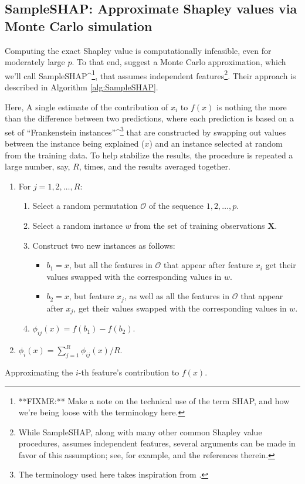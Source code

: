\subsection{SampleSHAP: Approximate Shapley values via Monte Carlo simulation \label{sec:SampleSHAP}}

Computing the exact Shapley value is computationally infeasible, even
for moderately large \(p\). To that end,
\citet{strumbelj-2014-explaining} suggest a Monte Carlo approximation,
which we'll call
SampleSHAP\^{}\footnote{**FIXME:** Make a note on the technical use of the term SHAP, and how we're being loose with the terminology here.},
that assumes independent
features\footnote{While SampleSHAP, along with many other common Shapley value procedures, assumes independent features, several arguments can be made in favor of this assumption; see, for example, \citet{chen-2020-true} and the references therein.}.
Their approach is described in Algorithm \ref{alg:SampleSHAP}.

Here, A single estimate of the contribution of \(x_i\) to
\(f\left(x\right)\) is nothing the more than the difference between two
predictions, where each prediction is based on a set of ``Frankenstein
instances''\^{}\footnote{The terminology used here takes inspiration from \citet[p. 231]{molnar-2019-iml}.}
that are constructed by swapping out values between the instance being
explained (\(x\)) and an instance selected at random from the training
data. To help stabilize the results, the procedure is repeated a large
number, say, \(R\), times, and the results averaged together.

\begin{algorithm}
\begin{enumerate}
  \item For $j = 1, 2, \dots, R$:
  \begin{enumerate}
    \item Select a random permutation $\mathcal{O}$ of the sequence $1, 2, \dots, p$.
    \item Select a random instance $w$ from the set of training observations $\boldsymbol{X}$.
    \item Construct two new instances as follows:
    \begin{itemize}
      \item $b_1 = x$, but all the features in $\mathcal{O}$ that appear after feature $x_i$ get their values swapped with the corresponding values in $w$.
      \item $b_2 = x$, but feature $x_j$, as well as all the features in $\mathcal{O}$ that appear after $x_j$, get their values swapped with the corresponding values in $w$.
    \end{itemize}
    \item $\phi_{ij}\left(x\right) = f\left(b_1\right) - f\left(b_2\right)$.
  \end{enumerate}
  \item $\phi_i\left(x\right) = \sum_{j = 1} ^ R \phi_{ij}\left(x\right) / R$.
\end{enumerate}
\caption{Approximating the $i$-th feature's contribution to $f\left(x\right)$. \label{alg:SampleSHAP}}
\end{algorithm}

